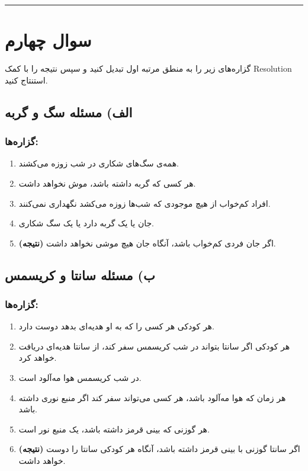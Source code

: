 \documentclass[a4paper,10pt]{article}
\begin{document}
\bigskip
\bigskip
\rule{\linewidth}{0.4pt}

\pagebreak

\section{سوال چهارم}

گزاره‌های زیر را به منطق مرتبه اول تبدیل کنید و سپس نتیجه را با کمک Resolution استنتاج کنید.

\subsection*{الف) مسئله سگ و گربه}

\subsubsection*{گزاره‌ها:}
\begin{enumerate}
	\item همه‌ی سگ‌های شکاری در شب زوزه می‌کشند. 
	\item هر کسی که گربه داشته باشد، موش نخواهد داشت.
	\item افراد کم‌خواب از هیچ موجودی که شب‌ها زوزه می‌کشد نگهداری نمی‌کنند.
	\item جان یا یک گربه دارد یا یک سگ شکاری.
	\item \textbf{(نتیجه)} اگر جان فردی کم‌خواب باشد، آنگاه جان هیچ موشی نخواهد داشت.
\end{enumerate}

\subsection*{ب) مسئله سانتا و کریسمس}

\subsubsection*{گزاره‌ها:}
\begin{enumerate}
	\item هر کودکی هر کسی را که به او هدیه‌ای بدهد دوست دارد.
	\item هر کودکی اگر سانتا بتواند در شب کریسمس سفر کند، از سانتا هدیه‌ای دریافت خواهد کرد.
	\item در شب کریسمس هوا مه‌آلود است.
	\item هر زمان که هوا مه‌آلود باشد، هر کسی می‌تواند سفر کند اگر منبع نوری داشته باشد.
	\item هر گوزنی که بینی قرمز داشته باشد، یک منبع نور است.
	\item \textbf{(نتیجه)} اگر سانتا گوزنی با بینی قرمز داشته باشد، آنگاه هر کودکی سانتا را دوست خواهد داشت.
\end{enumerate}
\end{document}
